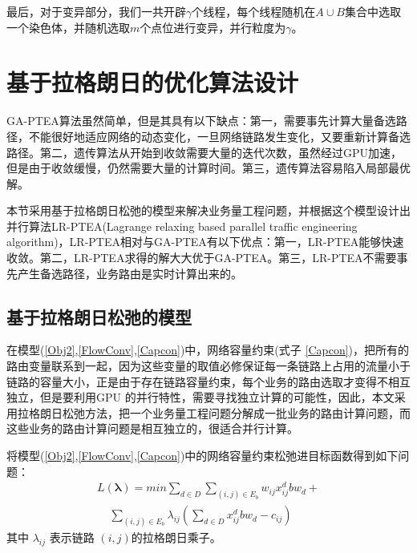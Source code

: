 最后，对于变异部分，我们一共开辟$\gamma$个线程，每个线程随机在$A\cup B$集合中选取一个染色体，并随机选取$m$个点位进行变异，并行粒度为$\gamma$。
\section{基于拉格朗日的优化算法设计}

GA-PTEA算法虽然简单，但是其具有以下缺点：第一，需要事先计算大量备选路径，不能很好地适应网络的动态变化，一旦网络链路发生变化，又要重新计算备选路径。第二，遗传算法从开始到收敛需要大量的迭代次数，虽然经过GPU加速，但是由于收敛缓慢，仍然需要大量的计算时间。第三，遗传算法容易陷入局部最优解。

本节采用基于拉格朗日松弛的模型来解决业务量工程问题，并根据这个模型设计出并行算法LR-PTEA(Lagrange relaxing based parallel traffic engineering algorithm)，LR-PTEA相对与GA-PTEA有以下优点：第一，LR-PTEA能够快速收敛。第二，LR-PTEA求得的解大大优于GA-PTEA。第三，LR-PTEA不需要事先产生备选路径，业务路由是实时计算出来的。
\subsection{基于拉格朗日松弛的模型}
在模型(\ref{Obj2},\ref{FlowConv},\ref{Capcon})中，网络容量约束(式子 \ref{Capcon})，把所有的路由变量联系到一起，因为这些变量的取值必修保证每一条链路上占用的流量小于链路的容量大小，正是由于存在链路容量约束，每个业务的路由选取才变得不相互独立，但是要利用GPU 的并行特性，需要寻找独立计算的可能性，因此，本文采用拉格朗日松弛方法，把一个业务量工程问题分解成一批业务的路由计算问题，而这些业务的路由计算问题是相互独立的，很适合并行计算。

将模型(\ref{Obj2},\ref{FlowConv},\ref{Capcon})中的网络容量约束松弛进目标函数得到如下问题：
\begin{equation}\label{LagProb}
\begin{split}
L(\mathbf{\lambda})= min\sum\limits_{d \in D}\sum\limits_{(i,j) \in E_b} w_{ij}x_{ij}^d bw_d+ \\ ~~~~~\sum\limits_{(i,j) \in E_b}\lambda_{ij}(\sum\limits_{d \in D} x_{ij}^d bw_d-c_{ij})
\end{split}
\end{equation}
其中 $\lambda_{ij}$ 表示链路 $(i,j)$的拉格朗日乘子。

